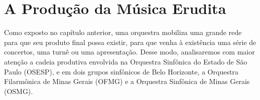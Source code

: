 \documentclass[a4paper, 12pt, openright, oneside, german, french, english, brazil]{abntex2}
\begin{document}

	
	
	
	
	
	
	
	
	
	
	
	\chapter{A Produção da Música Erudita}
	
	Como exposto no capítulo anterior, uma orquestra mobiliza uma grande rede para que seu produto final possa existir, para que venha à existência uma série de concertos, uma turnê ou uma apresentação. Desse modo, analisaremos com maior atenção a cadeia produtiva envolvida na Orquestra Sinfônica do Estado de São Paulo (OSESP), e em dois grupos sinfônicos de Belo Horizonte, a Orquestra Filarmônica de Minas Gerais (OFMG) e a Orquestra Sinfônica de Minas Gerais (OSMG).
	
\end{document}

